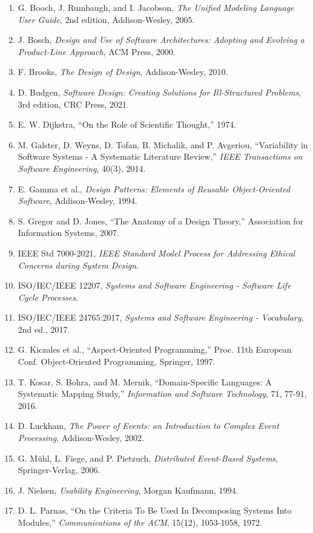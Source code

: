 \documentclass[10.5pt,a4paper]{ltjsarticle}
\begin{document}
\begin{enumerate}
  \item G. Booch, J. Rumbaugh, and I. Jacobson, \textit{The Unified Modeling Language User Guide}, 2nd edition, Addison-Wesley, 2005.
  \item J. Bosch, \textit{Design and Use of Software Architectures: Adopting and Evolving a Product-Line Approach}, ACM Press, 2000.
  \item F. Brooks, \textit{The Design of Design}, Addison-Wesley, 2010.
  \item D. Budgen, \textit{Software Design: Creating Solutions for Ill-Structured Problems}, 3rd edition, CRC Press, 2021.
  \item E. W. Dijkstra, “On the Role of Scientific Thought,” 1974.
  \item M. Galster, D. Weyns, D. Tofan, B. Michalik, and P. Avgeriou, “Variability in Software Systems - A Systematic Literature Review,” \textit{IEEE Transactions on Software Engineering}, 40(3), 2014.
  \item E. Gamma et al., \textit{Design Patterns: Elements of Reusable Object-Oriented Software}, Addison-Wesley, 1994.
  \item S. Gregor and D. Jones, “The Anatomy of a Design Theory,” Association for Information Systems, 2007.
  \item IEEE Std 7000-2021, \textit{IEEE Standard Model Process for Addressing Ethical Concerns during System Design}.
  \item ISO/IEC/IEEE 12207, \textit{Systems and Software Engineering - Software Life Cycle Processes}.
  \item ISO/IEC/IEEE 24765:2017, \textit{Systems and Software Engineering - Vocabulary}, 2nd ed., 2017.
  \item G. Kiczales et al., “Aspect-Oriented Programming,” Proc. 11th European Conf. Object-Oriented Programming, Springer, 1997.
  \item T. Kosar, S. Bohra, and M. Mernik, “Domain-Specific Languages: A Systematic Mapping Study,” \textit{Information and Software Technology}, 71, 77-91, 2016.
  \item D. Luckham, \textit{The Power of Events: an Introduction to Complex Event Processing}, Addison-Wesley, 2002.
  \item G. Mühl, L. Fiege, and P. Pietzuch, \textit{Distributed Event-Based Systems}, Springer-Verlag, 2006.
  \item J. Nielsen, \textit{Usability Engineering}, Morgan Kaufmann, 1994.
  \item D. L. Parnas, “On the Criteria To Be Used In Decomposing Systems Into Modules,” \textit{Communications of the ACM}, 15(12), 1053-1058, 1972.

\end{enumerate}
\end{document}
